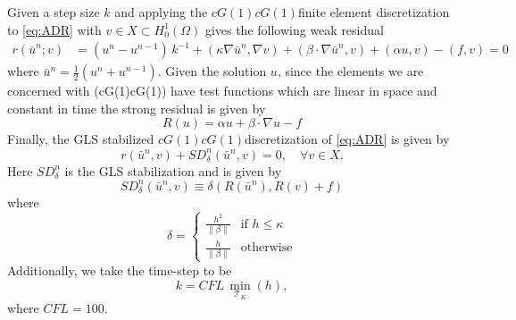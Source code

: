    Given a step size $k$ and applying the $cG(1)cG(1)$finite element
    discretization to \eqref{eq:ADR} with $v \in X \subset H^1_0(\Omega)$ gives
    the following weak residual
    \begin{equation}
    \begin{split}
        r(\bar{u}^n; v) &= \left(u^n - u^{n-1}\right)\,k^{-1}
            + (\kappa \nabla \bar{u}^n, \nabla v)
            + (\beta \cdot \nabla \bar{u}^n, v) + (\alpha u, v) - (f, v) = 0
    \end{split}
    \label{eqn:WeakADR}
    \end{equation}
    where $\bar{u}^n = \frac{1}{2}\left(u^n + u^{n-1}\right)$. Given the
    solution $u$, since the elements we are concerned with (cG(1)cG(1)) have
    test functions which are linear in space and constant in time the strong
    residual is given by
    \begin{equation}
        R(u) = \alpha u + \beta \cdot \nabla u - f
    \label{eqn:StrongADR}
    \end{equation}
    Finally, the GLS stabilized $cG(1)cG(1)$discretization of \eqref{eq:ADR} is
    given by
    \begin{equation}
        r(\bar{u}^n,v) + SD_{\delta}^n(\bar{u}^n,v) = 0,
            \quad \forall v \in X.
        \label{eqn:G2ADR}
    \end{equation}
    Here $SD_{\delta}^n$ is the GLS stabilization and is given by
    \begin{equation}
        SD_{\delta}^n(\bar{u}^n, v) \equiv \delta \left(R(\bar{u}^n), R(v)
            + f\right)
    \label{eq:ADRStabilization}
    \end{equation}
    where
    \begin{equation}
        \delta = \begin{cases}
            \frac{h^2}{\|\beta\|} & \text{if } h \le \kappa \\
            \frac{h}{\|\beta\|} & \text{otherwise}
        \end{cases}
        \label{eq:ADRdelta}
    \end{equation}
    Additionally, we take the time-step to be
    \begin{equation*}
        k = CFL\, \min_{\mathcal{T}_K}(h),
    \end{equation*}
    where $CFL=100$.

